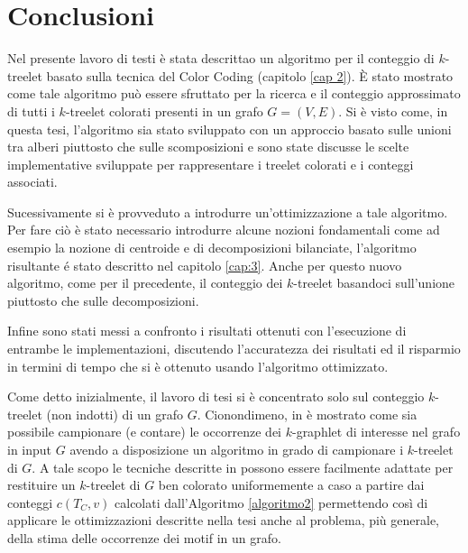 \chapter{Conclusioni}
Nel presente lavoro di testi \`e stata descrittao  un algoritmo per il conteggio di $ k $-treelet basato sulla tecnica del Color Coding (capitolo \ref{cap 2}). %
È stato mostrato come tale algoritmo pu\`o essere sfruttato per la ricerca e il conteggio approssimato di tutti i $ k $-treelet colorati presenti in un grafo $ G=(V,E) $.
Si \`e visto come, in questa tesi, l'algoritmo sia stato sviluppato con un approccio basato sulle unioni tra alberi piuttosto che sulle scomposizioni e %
sono state discusse le scelte implementative sviluppate per rappresentare i treelet colorati e i conteggi associati.

Sucessivamente si \`e provveduto a introdurre un'ottimizzazione a tale algoritmo.\\
Per fare ci\`o \`e stato necessario introdurre alcune nozioni fondamentali come ad esempio la nozione di centroide e di decomposizioni bilanciate, l'algoritmo risultante \'e stato descritto nel capitolo \ref{cap:3}.
Anche per questo nuovo algoritmo, come per il precedente, il conteggio dei $ k $-treelet basandoci sull'unione piuttosto che sulle decomposizioni. %

Infine sono stati messi a confronto i risultati ottenuti con l'esecuzione di entrambe le implementazioni, discutendo l'accuratezza dei risultati ed il risparmio in termini di tempo che si \`e ottenuto usando l'algoritmo ottimizzato.

Come detto inizialmente, il lavoro di tesi si \`e concentrato solo sul conteggio $ k $-treelet (non indotti) di un grafo $ G $. Cionondimeno, in \cite{bressan2018motif,bressan2019motivo} \`e mostrato come sia possibile campionare (e contare) le occorrenze dei $ k $-graphlet di interesse nel grafo in input $ G $ avendo a disposizione un algoritmo in grado di campionare i $ k $-treelet di $ G $.
A tale scopo le tecniche descritte in \cite{bressan2018motif,bressan2019motivo} possono essere facilmente adattate per restituire un $ k $-treelet di $ G $ ben colorato uniformemente a caso a partire dai conteggi $ c(T_C,v) $ calcolati dall'Algoritmo \ref{algoritmo2} permettendo così di applicare le ottimizzazioni descritte nella tesi anche al problema, più generale, della stima delle occorrenze dei motif in un grafo.

